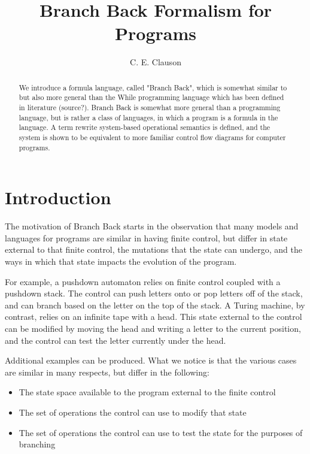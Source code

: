 \documentclass[11pt]{article}
\begin{document}
\title{Branch Back Formalism for Programs}
\author{C. E. Clauson}
\maketitle

\begin{abstract}
We introduce a formula language, called "Branch Back", which is somewhat similar to but also more general than the While programming language which has been defined in literature (source?).  Branch Back is somewhat more general than a programming language, but is rather a class of languages, in which a program is a formula in the language. A term rewrite system-based operational semantics is defined, and the system is shown to be equivalent to more familiar control flow diagrams for computer programs.
\end{abstract}

\section{Introduction}
The motivation of Branch Back starts in the observation that many models and languages for programs are similar in having finite control, but differ in state external to that finite control, the mutations that the state can undergo, and the ways in which that state impacts the evolution of the program.

For example, a pushdown automaton relies on finite control coupled with a pushdown stack.  The control can push letters onto or pop letters off of the stack, and can branch based on the letter on the top of the stack.  A Turing machine, by contrast, relies on an infinite tape with a head.  This state external to the control can be modified by moving the head and writing a letter to the current position, and the control can test the letter currently under the head.

Additional examples can be produced.  What we notice is that the various cases are similar in many respects, but differ in the following:

\begin{itemize}
\item The state space available to the program external to the finite control
\item The set of operations the control can use to modify that state
\item The set of operations the control can use to test the state for the purposes of branching
\end{itemize}
\end{document}
